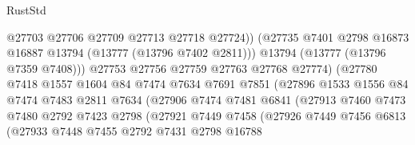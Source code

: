 \begin{lexlean}{RustStd}
\begin{coremodule}
                                    @27703
                                    @27706
                                    @27709
                                    @27713
                                    @27718
                                    @27724))
                                (@27735
                                  @7401
                                  @2798
                                  @16873
                                  @16887
                                  @13794
                                  (@13777 (@13796 @7402 @2811)))
                                @13794
                                (@13777 (@13796 @7359 @7408)))
                              @27753
                              @27756
                              @27759
                              @27763
                              @27768
                              @27774)
                            (@27780
                              @7418
                              @1557
                              @1604
                              @84
                              @7474
                              @7634
                              @7691
                              @7851
                              (@27896
                                @1533
                                @1556
                                @84
                                @7474
                                @7483
                                @2811
                                @7634
                                (@27906
                                  @7474
                                  @7481
                                  @6841
                                  (@27913
                                    @7460
                                    @7473
                                    @7480
                                    @2792
                                    @7423
                                    @2798
                                    (@27921
                                      @7449
                                      @7458
                                      (@27926
                                        @7449
                                        @7456
                                        @6813
                                        (@27933
                                          @7448
                                          @7455
                                          @2792
                                          @7431
                                          @2798
                                          @16788

\end{coremodule}
\end{lexlean}
